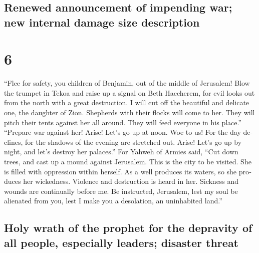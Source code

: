 \begin{paracol}{2}
\switchcolumn
\begin{otherlanguage}{english}

\hypertarget{renewed-announcement-of-impending-war-new-internal-damage-size-description}{%
\subsection{Renewed announcement of impending war; new internal damage
size
description}\label{renewed-announcement-of-impending-war-new-internal-damage-size-description}}

\hypertarget{section-11}{%
\section{6}\label{section-11}}

 ``Flee for safety, you children of Benjamin, out of the
middle of Jerusalem! Blow the trumpet in Tekoa and raise up a signal on
Beth Haccherem, for evil looks out from the north with a great
destruction.  I will cut off the beautiful and delicate
one, the daughter of Zion.  Shepherds with their flocks
will come to her. They will pitch their tents against her all around.
They will feed everyone in his place.''  ``Prepare war
against her! Arise! Let's go up at noon. Woe to us! For the day
declines, for the shadows of the evening are stretched out.
 Arise! Let's go up by night, and let's destroy her
palaces.''  For Yahweh of Armies said, ``Cut down trees,
and cast up a mound against Jerusalem. This is the city to be visited.
She is filled with oppression within herself.  As a well
produces its waters, so she produces her wickedness. Violence and
destruction is heard in her. Sickness and wounds are continually before
me.  Be instructed, Jerusalem, lest my soul be alienated
from you, lest I make you a desolation, an uninhabited land.''

\hypertarget{holy-wrath-of-the-prophet-for-the-depravity-of-all-people-especially-leaders-disaster-threat}{%
\subsection{Holy wrath of the prophet for the depravity of all people,
especially leaders; disaster
threat}\label{holy-wrath-of-the-prophet-for-the-depravity-of-all-people-especially-leaders-disaster-threat}}


\end{otherlanguage}
\end{paracol}
